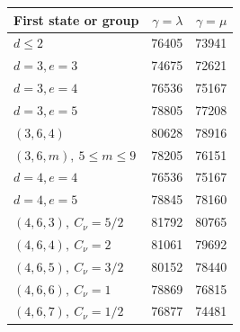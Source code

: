 \begin{center}
\small
\begin{tabular}{lrr}
First state or group&\(\gamma=\lambda\)&\(\gamma=\mu\)\\ \hline
\(d\le2\)&76405&73941\\
\(d=3,e=3\)&74675&72621\\
\(d=3,e=4\)&76536&75167\\
\(d=3,e=5\)&78805&77208\\
\((3,6,4)\)&80628&78916\\
\((3,6,m),\ 5\le m\le9\)&78205&76151\\
\(d=4,e=4\)&76536&75167\\
\(d=4,e=5\)&78845&78160\\
\((4,6,3),\ C_\nu=5/2\)&81792&80765\\
\((4,6,4),\ C_\nu=2\)&81061&79692\\
\((4,6,5),\ C_\nu=3/2\)&80152&78440\\
\((4,6,6),\ C_\nu=1\)&78869&76815\\
\((4,6,7),\ C_\nu=1/2\)&76877&74481\\
\end{tabular}
\end{center}

